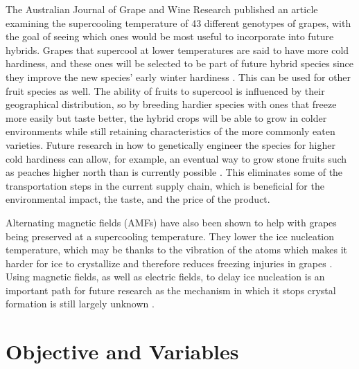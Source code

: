 \documentclass[12pt, a4paper]{article}
\begin{document}
The Australian Journal of Grape and Wine Research published an article
examining the supercooling temperature of 43 different genotypes of
grapes, with the goal of seeing which ones would be most useful to
incorporate into future hybrids. Grapes that supercool at lower
temperatures are said to have more cold hardiness, and these ones will
be selected to be part of future hybrid species since they improve the
new species' early winter hardiness \cite{londo2019}. This can be used
for other fruit species as well. The ability of fruits to supercool is
influenced by their geographical distribution, so by breeding hardier
species with ones that freeze more easily but taste better, the hybrid
crops will be able to grow in colder environments while still retaining
characteristics of the more commonly eaten varieties. Future research in
how to genetically engineer the species for higher cold hardiness can
allow, for example, an eventual way to grow stone fruits such as peaches
higher north than is currently possible \cite{quamme1991}. This
eliminates some of the transportation steps in the current supply chain,
which is beneficial for the environmental impact, the taste, and the
price of the product.

Alternating magnetic fields (AMFs) have also been shown to help with
grapes being preserved at a supercooling temperature. They lower the ice
nucleation temperature, which may be thanks to the vibration of the
atoms which makes it harder for ice to crystallize and therefore reduces
freezing injuries in grapes \cite{jiang2025}. Using magnetic fields, as
well as electric fields, to delay ice nucleation is an important path
for future research as the mechanism in which it stops crystal formation
is still largely unknown \cite{kang2020}.

\section{Objective and Variables}

\end{document}

